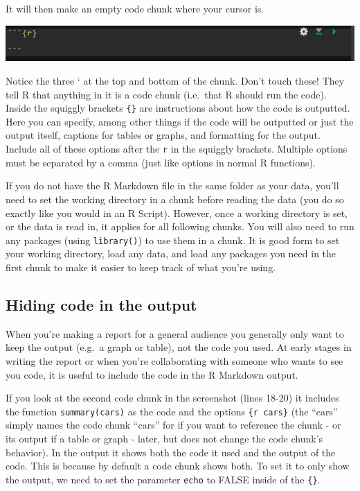 \documentclass[
]{krantz}
\begin{document}
It will then make an empty code chunk where your cursor is.

\includegraphics{images/chunk_example.PNG}

Notice the three ` at the top and bottom of the chunk. Don't touch these! They tell R that anything in it is a code chunk (i.e.~that R should run the code). Inside the squiggly brackets \texttt{\{\}} are instructions about how the code is outputted. Here you can specify, among other things if the code will be outputted or just the output itself, captions for tables or graphs, and formatting for the output. Include all of these options after the \texttt{r} in the squiggly brackets. Multiple options must be separated by a comma (just like options in normal R functions).

If you do not have the R Markdown file in the same folder as your data, you'll need to set the working directory in a chunk before reading the data (you do so exactly like you would in an R Script). However, once a working directory is set, or the data is read in, it applies for all following chunks. You will also need to run any packages (using \texttt{library()}) to use them in a chunk. It is good form to set your working directory, load any data, and load any packages you need in the first chunk to make it easier to keep track of what you're using.

\hypertarget{hiding-code-in-the-output}{%
\subsection{Hiding code in the output}\label{hiding-code-in-the-output}}

When you're making a report for a general audience you generally only want to keep the output (e.g.~a graph or table), not the code you used. At early stages in writing the report or when you're collaborating with someone who wants to see you code, it is useful to include the code in the R Markdown output.

If you look at the second code chunk in the screenshot (lines 18-20) it includes the function \texttt{summary(cars)} as the code and the options \texttt{\{r\ cars\}} (the ``cars'' simply names the code chunk ``cars'' for if you want to reference the chunk - or its output if a table or graph - later, but does not change the code chunk's behavior). In the output it shows both the code it used and the output of the code. This is because by default a code chunk shows both. To set it to only show the output, we need to set the parameter \texttt{echo} to FALSE inside of the \texttt{\{\}}.
\end{document}
